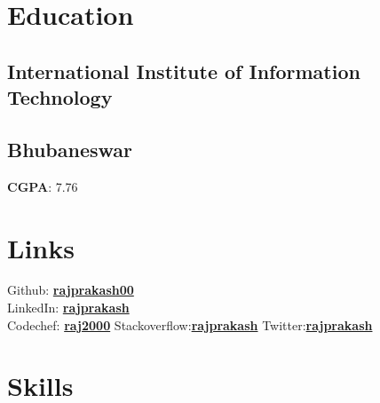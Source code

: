 \documentclass[]{deedy-resume-openfont}
\begin{document}
%
%

%
%

\begin{minipage}[t]{0.33\textwidth} 


\section{Education} 

\subsection{International Institute of
Information Technology}
\subsection{Bhubaneswar}
\textbf{CGPA}: 7.76
\sectionsep


\section{Links} 
Github: \href{https://github.com/rajprakash00}{\bf rajprakash00} \\
LinkedIn:  \href{https://www.linkedin.com/in/rajprakash-sahoo-7597a216a/}{\bf rajprakash} \\
Codechef: \href{https://codechef.com/users/raj2000}{\bf raj2000}
Stackoverflow:\href{https://stackoverflow.com/users/11349303/d4rk4rmy}{\bf rajprakash}
Twitter:\href{https://twitter.com/RajprakashSahoo}{\bf rajprakash}


\section{Skills}

\end{minipage}
\end{document}

